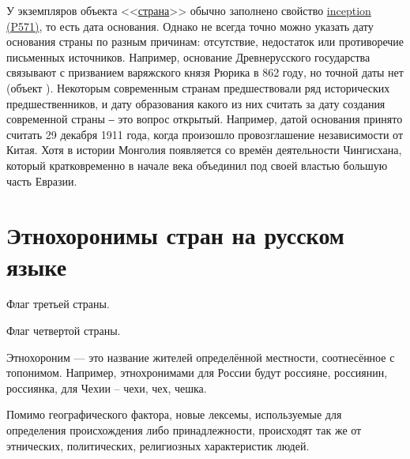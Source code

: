 У экземпляров объекта <<\href{https://www.wikidata.org/wiki/Q6256}{страна}>> обычно заполнено свойство \href{https://www.wikidata.org/wiki/Property:P571}{inception (P571)}, то есть дата основания. Однако не всегда точно можно  указать дату основания страны по разным причинам: отсутствие, недостаток или противоречие письменных источников. Например, основание Древнерусского государства связывают с призванием варяжского князя Рюрика в 862 году, но точной даты нет (объект ). Некоторым современным странам предшествовали ряд исторических предшественников, и дату образования какого из них считать за дату создания современной страны ‒ это вопрос открытый. Например, датой основания  принято считать 29 декабря 1911 года, когда произошло провозглашение независимости от Китая. Хотя в истории Монголия появляется со времён деятельности Чингисхана, который кратковременно в начале \MakeUppercase{} века объединил под своей властью большую часть Евразии.



\section{Этнохоронимы стран на русском языке}

\begin{marginfigure}[0.0cm]
	{
		\setlength{\fboxsep}{0pt}%
		\setlength{\fboxrule}{1pt}%
	}
	\caption{Флаг третьей страны.}%
	\label{fig:flag_israel}%
\end{marginfigure}
\begin{marginfigure}[0.0cm]
	{
		\setlength{\fboxsep}{0pt}%
		\setlength{\fboxrule}{1pt}%
	}
	\caption{Флаг четвертой страны.}%
	\label{fig:flag_mongolia}%
\end{marginfigure}

Этнохороним — это название жителей определённой местности, соотнесённое с топонимом. Например, этнохронимами для России будут россияне, россиянин, россиянка, для Чехии – чехи, чех, чешка.

Помимо географического фактора, новые лексемы, используемые для определения происхождения либо принадлежности, происходят так же от этнических, политических, религиозных характеристик людей\cite{Zhuravleva2012}. 

